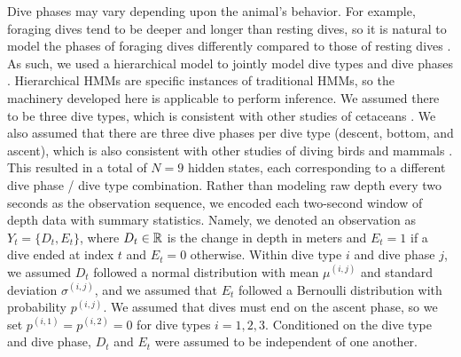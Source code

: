Dive phases may vary depending upon the animal's behavior. For example, foraging dives tend to be deeper and longer than resting dives, so it is natural to model the phases of foraging dives differently compared to those of resting dives \citep{Tennessen:2019b}. As such, we used a hierarchical model to jointly model dive types and dive phases \citep{Barajas:2017,McRae:2024}. Hierarchical HMMs are specific instances of traditional HMMs, so the machinery developed here is applicable to perform inference. 
%
We assumed there to be three dive types, which is consistent with other studies of cetaceans \citep[e.g. resting, foraging and traveling,][]{Barajas:2017}. We also assumed that there are three dive phases per dive type (descent, bottom, and ascent), which is also consistent with other studies of diving birds and mammals \citep[e.g.][]{Vivant:2014}. This resulted in a total of $N = 9$ hidden states, each corresponding to a different dive phase / dive type combination.
%
Rather than modeling raw depth every two seconds as the observation sequence, we encoded each two-second window of depth data with summary statistics. Namely, we denoted an observation as $Y_t = \{D_t,E_t\}$, where $D_t \in \mathbb{R}$ is the change in depth in meters and $E_t = 1$ if a dive ended at index $t$ and $E_t = 0$ otherwise. 
Within dive type $i$ and dive phase $j$, we assumed $D_t$ followed a normal distribution with mean $\mu^{(i,j)}$ and standard deviation $\sigma^{(i,j)}$, and we assumed that $E_t$ followed a Bernoulli distribution with probability $p^{(i,j)}$. We assumed that dives must end on the ascent phase, so we set $p^{(i,1)} = p^{(i,2)} = 0$ for dive types $i = 1,2,3$. Conditioned on the dive type and dive phase, $D_t$ and $E_t$ were assumed to be independent of one another.

